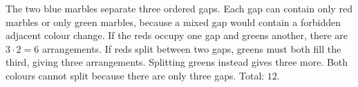 The two blue marbles separate three ordered gaps. Each gap can contain only red marbles or only green marbles, because a mixed gap would contain a forbidden adjacent colour change. If the reds occupy one gap and greens another, there are $3\cdot2=6$ arrangements. If reds split between two gaps, greens must both fill the third, giving three arrangements. Splitting greens instead gives three more. Both colours cannot split because there are only three gaps. Total: $\boxed{12}$.
